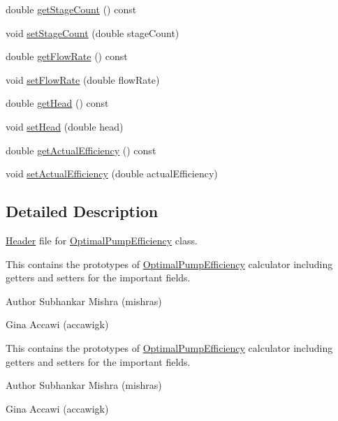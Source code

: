 \begin{DoxyCompactItemize}
double \hyperlink{class_optimal_pump_efficiency_aac0c1a4a6492bf00b245c2a61d100eaa}{get\+Stage\+Count} () const
\item 
void \hyperlink{class_optimal_pump_efficiency_a5b0b2a24a87c1c8fc92aa96c6ba4b727}{set\+Stage\+Count} (double stage\+Count)
\item 
double \hyperlink{class_optimal_pump_efficiency_a77c6618681b0fd3a0fc02dc49d16ee99}{get\+Flow\+Rate} () const
\item 
void \hyperlink{class_optimal_pump_efficiency_a90067b57c559fd3274fb8d6e00f6221d}{set\+Flow\+Rate} (double flow\+Rate)
\item 
double \hyperlink{class_optimal_pump_efficiency_af31fdb10aabc197ff7536c9bbe006573}{get\+Head} () const
\item 
void \hyperlink{class_optimal_pump_efficiency_ac317c900ec68797cf051977147ea33da}{set\+Head} (double head)
\item 
double \hyperlink{class_optimal_pump_efficiency_aa2ac8a7c61bc28f82e30cb44b9c21008}{get\+Actual\+Efficiency} () const
\item 
void \hyperlink{class_optimal_pump_efficiency_a539b20c53c7ba6a5983a60d74be4ac9e}{set\+Actual\+Efficiency} (double actual\+Efficiency)
\end{DoxyCompactItemize}


\subsection{Detailed Description}
\hyperlink{class_header}{Header} file for \hyperlink{class_optimal_pump_efficiency}{Optimal\+Pump\+Efficiency} class. 

This contains the prototypes of \hyperlink{class_optimal_pump_efficiency}{Optimal\+Pump\+Efficiency} calculator including getters and setters for the important fields.

\begin{DoxyAuthor}{Author}
Subhankar Mishra (mishras) 

Gina Accawi (accawigk) 
\end{DoxyAuthor}


This contains the prototypes of \hyperlink{class_optimal_pump_efficiency}{Optimal\+Pump\+Efficiency} calculator including getters and setters for the important fields.

\begin{DoxyAuthor}{Author}
Subhankar Mishra (mishras) 

Gina Accawi (accawigk) 
\end{DoxyAuthor}


